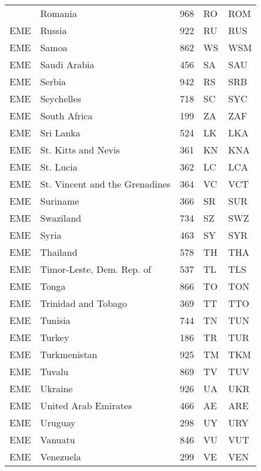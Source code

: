 \documentclass[12pt,a4paper,oldfontcommands]{memoir}
\begin{document}
\begin{ThreePartTable}
\begin{longtable}
{EME} & Romania & 968 & RO & ROM \\
{EME} & Russia & 922 & RU & RUS \\
{EME} & Samoa & 862 & WS & WSM \\
{EME} & Saudi Arabia & 456 & SA & SAU \\
{EME} & Serbia & 942 & RS & SRB \\
{EME} & Seychelles & 718 & SC & SYC \\
{EME} & South Africa & 199 & ZA & ZAF \\
{EME} & Sri Lanka & 524 & LK & LKA \\
{EME} & St. Kitts and Nevis & 361 & KN & KNA \\
{EME} & St. Lucia & 362 & LC & LCA \\
{EME} & St. Vincent and the Grenadines & 364 & VC & VCT \\
{EME} & Suriname & 366 & SR & SUR \\
{EME} & Swaziland & 734 & SZ & SWZ \\
{EME} & Syria & 463 & SY & SYR \\
{EME} & Thailand & 578 & TH & THA \\
{EME} & Timor-Leste, Dem. Rep. of & 537 & TL & TLS \\
{EME} & Tonga & 866 & TO & TON \\
{EME} & Trinidad and Tobago & 369 & TT & TTO \\
{EME} & Tunisia & 744 & TN & TUN \\
{EME} & Turkey & 186 & TR & TUR \\
{EME} & Turkmenistan & 925 & TM & TKM \\
{EME} & Tuvalu & 869 & TV & TUV \\
{EME} & Ukraine & 926 & UA & UKR \\
{EME} & United Arab Emirates & 466 & AE & ARE \\
{EME} & Uruguay & 298 & UY & URY \\
{EME} & Vanuatu & 846 & VU & VUT \\
{EME} & Venezuela & 299 & VE & VEN \\
    
  \end{longtable}
\end{ThreePartTable}
\end{document}
